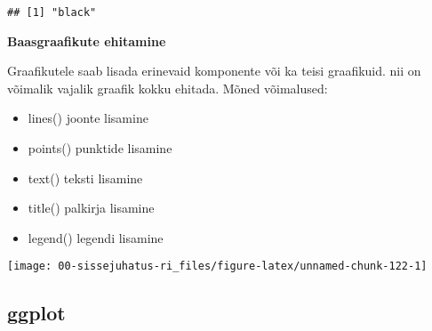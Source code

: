 \documentclass[
]{book}
\newenvironment{Shaded}{\begin{snugshade}}{\end{snugshade}}
\newcommand{\AttributeTok}[1]{\textcolor[rgb]{0.77,0.63,0.00}{#1}}
\newcommand{\DecValTok}[1]{\textcolor[rgb]{0.00,0.00,0.81}{#1}}
\newcommand{\FunctionTok}[1]{\textcolor[rgb]{0.00,0.00,0.00}{#1}}
\newcommand{\NormalTok}[1]{#1}
\newcommand{\OtherTok}[1]{\textcolor[rgb]{0.56,0.35,0.01}{#1}}
\newcommand{\SpecialCharTok}[1]{\textcolor[rgb]{0.00,0.00,0.00}{#1}}
\newcommand{\StringTok}[1]{\textcolor[rgb]{0.31,0.60,0.02}{#1}}
\providecommand{\tightlist}{%
  \setlength{\itemsep}{0pt}\setlength{\parskip}{0pt}}
\begin{document}
\begin{verbatim}
## [1] "black"
\end{verbatim}

\textbf{Baasgraafikute ehitamine}

Graafikutele saab lisada erinevaid komponente või ka teisi graafikuid. nii on võimalik vajalik graafik kokku ehitada. Mõned võimalused:

\begin{itemize}
\tightlist
\item
  lines() joonte lisamine
\item
  points() punktide lisamine
\item
  text() teksti lisamine
\item
  title() palkirja lisamine
\item
  legend() legendi lisamine
\end{itemize}

\begin{Shaded}
\end{Shaded}

\begin{center}\texttt{[image: 00-sissejuhatus-ri\_files/figure-latex/unnamed-chunk-122-1]} \end{center}

\hypertarget{ggplot}{%
\subsection{ggplot}\label{ggplot}}
\end{document}
